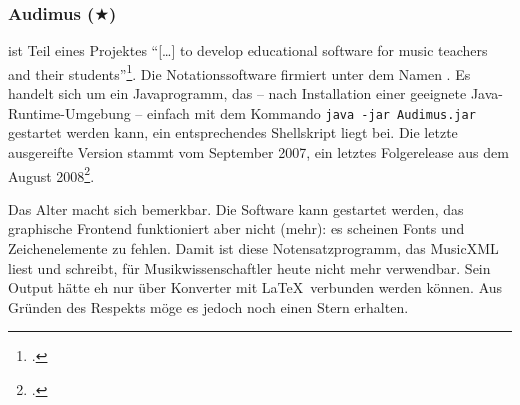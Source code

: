 %
%
%



\subsubsection{Audimus ($\bigstar$)}

\label{Audimus} ist Teil eines Projektes \enquote{[\ldots] to
develop educational software for music teachers and their
students}\footcite[vgl.][\nopage wp]{Audimus2008a}. Die Notationssoftware
firmiert unter dem Namen . Es handelt sich um ein
Javaprogramm, das -- nach Installation einer geeignete Java-Runtime-Umgebung --
einfach mit dem Kommando \texttt{java -jar Audimus.jar} gestartet werden kann,
ein entsprechendes Shellskript liegt bei. Die letzte ausgereifte Version stammt
vom September 2007, ein letztes Folgerelease aus dem August
2008\footcite[vgl.][\nopage wp]{Audimus2008b}.

Das Alter macht sich bemerkbar. Die Software kann gestartet werden, das
graphische Frontend funktioniert aber nicht (mehr): es scheinen Fonts und
Zeichenelemente zu fehlen. Damit ist diese Notensatzprogramm, das MusicXML liest
und schreibt, für Musikwissenschaftler heute nicht mehr verwendbar. Sein Output
hätte eh nur über Konverter mit \LaTeX\ verbunden werden können. Aus Gründen des
Respekts möge es jedoch noch einen Stern erhalten.



%
